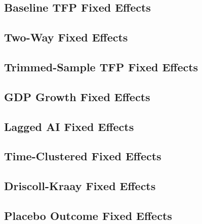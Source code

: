\subsection{Baseline TFP Fixed Effects}
{\scriptsize
{}
}

\subsection{Two-Way Fixed Effects}
{\scriptsize
{}
}

\subsection{Trimmed-Sample TFP Fixed Effects}
{\scriptsize
{}
}

\subsection{GDP Growth Fixed Effects}
{\scriptsize
{}
}

\subsection{Lagged AI Fixed Effects}
{\scriptsize
{}
}

\subsection{Time-Clustered Fixed Effects}
{\scriptsize
{}
}

\subsection{Driscoll-Kraay Fixed Effects}
{\scriptsize
{}
}

\subsection{Placebo Outcome Fixed Effects}
{\scriptsize
{}
}

